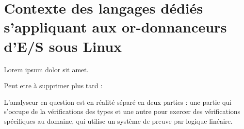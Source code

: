 \section[Contexte des langages dédiés s'appliquant aux ordonnanceurs d'E/S sous Linux]{Contexte des langages dédiés s'appliquant aux or-donnanceurs d'E/S sous Linux}
\label{context}

Lorem ipsum dolor sit amet.


Peut etre à supprimer plus tard :

L'analyseur en question est en réalité séparé en deux parties : une partie qui s'occupe de la vérifications des types et une autre pour exercer des vérifications spécifiques au domaine, qui utilise un système de preuve par logique linéaire.